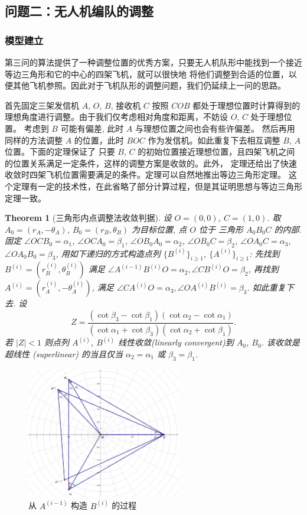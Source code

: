 \documentclass{my_paper}
\newtheorem{theorem}{Theorem}
\begin{document}
\subsection{问题二：无人机编队的调整}

\subsubsection{模型建立}
第三问的算法提供了一种调整位置的优秀方案，只要无人机队形中能找到一个接近等边三角形和它的中心的四架飞机，就可以很快地
将他们调整到合适的位置，以便其他飞机参照。因此对于飞机队形的调整问题，我们仍延续上一问的思路。

首先固定三架发信机 $A$, $O$, $B$, 接收机 $C$ 按照 $COB$ 
都处于理想位置时计算得到的理想角度进行调整。由于我们仅考虑相对角度和距离，不妨设 $O$, $C$ 处于理想位置。
考虑到 $B$ 可能有偏差, 此时 $A$ 与理想位置之间也会有些许偏差。
然后再用同样的方法调整 $A$ 的位置，此时 $BOC$ 作为发信机。如此重复下去相互调整 $B$, $A$ 位置。下面的定理保证了
只要 $B$, $C$ 的初始位置接近理想位置，且四架飞机之间的位置关系满足一定条件，这样的调整方案是收敛的。此外，
定理还给出了快速收敛时四架飞机位置需要满足的条件。定理可以自然地推出等边三角形定理。
这个定理有一定的技术性，在此省略了部分计算过程，但是其证明思想与等边三角形定理一致。 
\begin{theorem}[三角形内点调整法收敛判据]
    \label{remarkable}
    设 $O=(0,0)$, $C=(1,0)$. 取 $A_0=(r_A, -\theta_A)$, $B_0 = (r_B,\theta_B)$ 为目标位置, 点 $O$ 位于
    三角形 $A_0B_0C$ 的内部.
    固定 $\angle OCB_0=\alpha_1$, $\angle OCA_0=\beta_1$, $\angle OB_0A_0=\alpha_2$, $\angle OB_0C=\beta_2$,
    $\angle OA_0C=\alpha_3$, $\angle OA_0B_0=\beta_3$,  
    用如下递归的方式构造点列 $\{B^{(i)}\}_{i\geq 1}$, $\{A^{(i)}\}_{i\geq 1}$: 先找到
    $B^{(i)}=(r_B^{(i)},\theta_B^{(i)})$ 满足 $\angle A^{(i-1)}B^{(i)}O=\alpha_2, \angle CB^{(i)}O=\beta_2$, 再找到
    $A^{(i)}=(r_A^{(i)},-\theta_A^{(i)})$, 满足 $\angle CA^{(i)}O=\alpha_3, \angle OA^{(i)}B^{(i)}=\beta_3$. 如此重复下去.
    设 
    $$
        Z = \frac{(\cot \beta_3-\cot\beta_1)(\cot \alpha_2-\cot \alpha_1)}
        {(\cot \alpha_1+\cot \beta_3)(\cot \alpha_2+\cot \beta_1)}.
    $$
    若 $|Z|< 1$ 则点列 $A^{(i)}$, $B^{(i)}$ 线性收敛(linearly convergent)到 $A_0$, $B_0$. 
    该收敛是超线性 (superlinear) 的当且仅当 $\alpha_2=\alpha_1$ 或 $\beta_3=\beta_1$. 
\end{theorem}
\begin{figure}[H]
    \centering
    \includegraphics[width=0.6\textwidth]{sketch4}
    \caption{从 $A^{(i-1)}$ 构造 $B^{(i)}$ 的过程} 
\end{figure}
\end{document}
